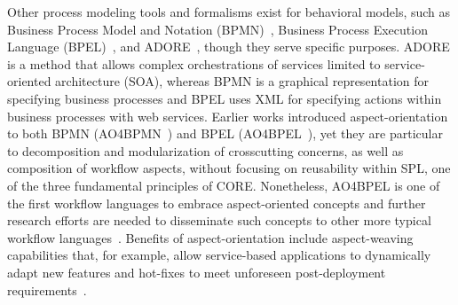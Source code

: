 Other process modeling tools and formalisms exist for behavioral models, such as Business Process Model and Notation (BPMN)~\cite{white2004business}, Business Process Execution Language (BPEL)~\cite{standard2007web}, and ADORE~\cite{mosser2010workflow}, though they serve specific purposes. ADORE is a method that allows complex orchestrations of services limited to service-oriented architecture (SOA), whereas BPMN is a graphical representation for specifying business processes and BPEL uses XML for specifying actions within business processes with web services. Earlier works introduced aspect-orientation to both BPMN (AO4BPMN~\cite{charfi2010aspect}) and BPEL (AO4BPEL~\cite{charfi2007ao4bpel}), yet they are particular to decomposition and modularization of crosscutting concerns, as well as composition of workflow aspects, without focusing on reusability within SPL, one of the three fundamental principles of CORE. Nonetheless, AO4BPEL is one of the first workflow languages to embrace aspect-oriented concepts and further research efforts are needed to disseminate such concepts to other more typical workflow languages~\cite{charfi2006aspect}. Benefits of aspect-orientation include aspect-weaving capabilities that, for example, allow service-based applications to dynamically adapt new features and hot-fixes to meet unforeseen post-deployment requirements~\cite{courbis2005weaving}.
